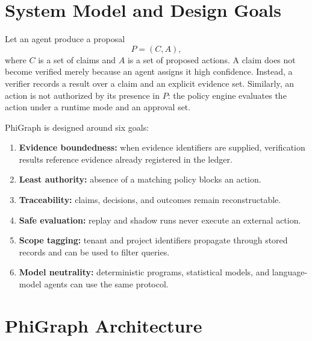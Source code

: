 \documentclass[11pt]{article}
\begin{document}
\section{System Model and Design Goals}
\label{sec:systemmodel}

Let an agent produce a proposal
\[
P = (C, A),
\]
where $C$ is a set of claims and $A$ is a set of proposed actions. A claim does
not become verified merely because an agent assigns it high confidence.
Instead, a verifier records a result over a claim and an explicit evidence set.
Similarly, an action is not authorized by its presence in $P$: the policy
engine evaluates the action under a runtime mode and an approval set.

PhiGraph is designed around six goals:

\begin{enumerate}[leftmargin=*]
  \item \textbf{Evidence boundedness:} when evidence identifiers are supplied,
        verification results reference evidence already registered in the
        ledger.
  \item \textbf{Least authority:} absence of a matching policy blocks an
        action.
  \item \textbf{Traceability:} claims, decisions, and outcomes remain
        reconstructable.
  \item \textbf{Safe evaluation:} replay and shadow runs never execute an
        external action.
  \item \textbf{Scope tagging:} tenant and project identifiers propagate
        through stored records and can be used to filter queries.
  \item \textbf{Model neutrality:} deterministic programs, statistical models,
        and language-model agents can use the same protocol.
\end{enumerate}

\section{PhiGraph Architecture}
\label{sec:architecture}
\end{document}
